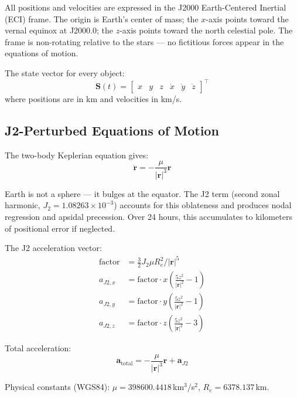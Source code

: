\documentclass[12pt,a4paper]{article}
\begin{document}
All positions and velocities are expressed in the J2000 Earth-Centered Inertial (ECI) frame. The origin is Earth's center of mass; the $x$-axis points toward the vernal equinox at J2000.0; the $z$-axis points toward the north celestial pole. The frame is non-rotating relative to the stars --- no fictitious forces appear in the equations of motion.

The state vector for every object:
\begin{equation}
\mathbf{S}(t) = \begin{bmatrix} x & y & z & \dot{x} & \dot{y} & \dot{z} \end{bmatrix}^\top
\end{equation}
where positions are in km and velocities in km/s.

\subsection{J2-Perturbed Equations of Motion}

The two-body Keplerian equation gives:
\begin{equation}
\ddot{\mathbf{r}} = -\frac{\mu}{|\mathbf{r}|^3} \mathbf{r}
\end{equation}

Earth is not a sphere --- it bulges at the equator. The J2 term (second zonal harmonic, $J_2 = 1.08263 \times 10^{-3}$) accounts for this oblateness and produces nodal regression and apsidal precession. Over 24 hours, this accumulates to kilometers of positional error if neglected.

The J2 acceleration vector:
\begin{align}
\text{factor} &= \frac{3}{2} J_2 \mu R_e^2 / |\mathbf{r}|^5 \\
a_{J2,x} &= \text{factor} \cdot x \left(\frac{5z^2}{|\mathbf{r}|^2} - 1\right) \\
a_{J2,y} &= \text{factor} \cdot y \left(\frac{5z^2}{|\mathbf{r}|^2} - 1\right) \\
a_{J2,z} &= \text{factor} \cdot z \left(\frac{5z^2}{|\mathbf{r}|^2} - 3\right)
\end{align}

Total acceleration:
\begin{equation}
\mathbf{a}_{\text{total}} = -\frac{\mu}{|\mathbf{r}|^3}\mathbf{r} + \mathbf{a}_{J2}
\end{equation}

Physical constants (WGS84): $\mu = 398600.4418$\,km$^3$/s$^2$, $R_e = 6378.137$\,km.
\end{document}
